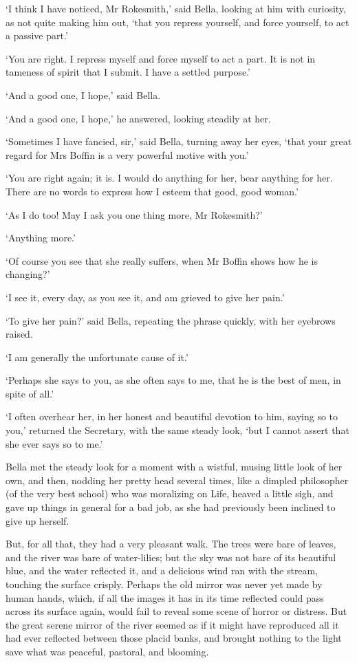 ‘I think I have noticed, Mr Rokesmith,’ said Bella, looking at him with
curiosity, as not quite making him out, ‘that you repress yourself, and
force yourself, to act a passive part.’

‘You are right. I repress myself and force myself to act a part. It is
not in tameness of spirit that I submit. I have a settled purpose.’

‘And a good one, I hope,’ said Bella.

‘And a good one, I hope,’ he answered, looking steadily at her.

‘Sometimes I have fancied, sir,’ said Bella, turning away her eyes,
‘that your great regard for Mrs Boffin is a very powerful motive with
you.’

‘You are right again; it is. I would do anything for her, bear anything
for her. There are no words to express how I esteem that good, good
woman.’

‘As I do too! May I ask you one thing more, Mr Rokesmith?’

‘Anything more.’

‘Of course you see that she really suffers, when Mr Boffin shows how he
is changing?’

‘I see it, every day, as you see it, and am grieved to give her pain.’

‘To give her pain?’ said Bella, repeating the phrase quickly, with her
eyebrows raised.

‘I am generally the unfortunate cause of it.’

‘Perhaps she says to you, as she often says to me, that he is the best
of men, in spite of all.’

‘I often overhear her, in her honest and beautiful devotion to him,
saying so to you,’ returned the Secretary, with the same steady look,
‘but I cannot assert that she ever says so to me.’

Bella met the steady look for a moment with a wistful, musing little
look of her own, and then, nodding her pretty head several times, like
a dimpled philosopher (of the very best school) who was moralizing on
Life, heaved a little sigh, and gave up things in general for a bad job,
as she had previously been inclined to give up herself.

But, for all that, they had a very pleasant walk. The trees were bare of
leaves, and the river was bare of water-lilies; but the sky was not bare
of its beautiful blue, and the water reflected it, and a delicious
wind ran with the stream, touching the surface crisply. Perhaps the old
mirror was never yet made by human hands, which, if all the images it
has in its time reflected could pass across its surface again, would
fail to reveal some scene of horror or distress. But the great serene
mirror of the river seemed as if it might have reproduced all it had
ever reflected between those placid banks, and brought nothing to the
light save what was peaceful, pastoral, and blooming.

